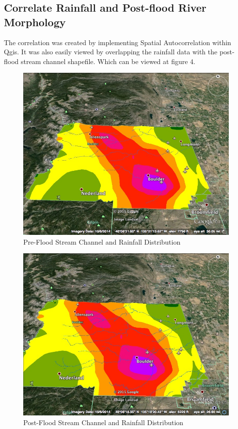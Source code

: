 \documentclass[twoside]{article}
\begin{document}
\begin{multicols}{2}
\subsection{Correlate Rainfall and Post-flood River Morphology}
The correlation was created by implementing Spatial Autocorrelation within Qgis. It was also easily viewed by overlapping the rainfall data with the post-flood stream channel shapefile. Which can be viewed at figure 4. 
\begin{figure} %
\includegraphics[width=1.6\columnwidth]{preflood.jpg}
\caption{Pre-Flood Stream Channel and Rainfall Distribution\label{fig:preflood}}
\end{figure}
\begin{figure} %
\includegraphics[width=1.6\columnwidth]{postflood.jpg}
\caption{Post-Flood Stream Channel and Rainfall Distribution\label{fig:postflood}}
\end{figure}


\end{multicols}
\end{document}
